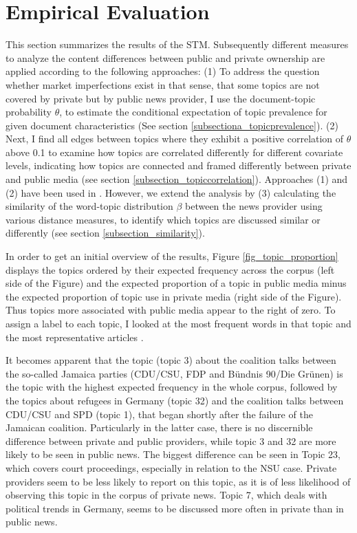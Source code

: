 \documentclass[12pt,a4paper,notitlepage]{article}
\begin{document}
\section{Empirical Evaluation}\label{ch_empirical}

This section summarizes the results of the STM. Subsequently different measures to analyze the content differences between public and private ownership are applied according to the following approaches: (1) To address the question whether market imperfections exist in that sense, that some topics are not covered by private but by public news provider, I use the document-topic probability $\theta$, to estimate the conditional expectation of topic prevalence for given document characteristics (See section \ref{subsectiona_topicprevalence}). (2) Next, I find all edges between topics where they exhibit a positive correlation of $\theta$ above 0.1 to examine how topics are correlated differently for different covariate levels, indicating how topics are connected and framed differently between private and public media (see section \ref{subsection_topiccorrelation}). Approaches (1) and (2) have been used in \citep{roberts_model_2016}. However, we extend the analysis by (3) calculating the similarity of the word-topic distribution $\beta$ between the news provider using various distance measures, to identify which topics are discussed similar or differently (see section \ref{subsection_similarity}). 

In order to get an initial overview of the results, Figure \ref{fig_topic_proportion} displays the topics ordered by their expected frequency across the corpus (left side of the Figure) and the expected proportion of a topic in public media minus the expected proportion of topic use in private media (right side of the Figure). Thus topics more associated with public media appear to the right of zero. To assign a label to each topic, I looked at the most frequent words in that topic and the most representative articles \citep{roberts_model_2016}. 

It becomes apparent that the topic (topic 3) about the coalition talks between the so-called Jamaica parties (CDU/CSU, FDP and Bündnis 90/Die Grünen) is the topic with the highest expected frequency in the whole corpus, followed by the topics about refugees in Germany (topic 32) and the coalition talks between CDU/CSU and SPD (topic 1), that began shortly after the failure of the Jamaican coalition. Particularly in the latter case, there is no discernible difference between private and public providers, while topic 3 and 32 are more likely to be seen in public news. The biggest difference can be seen in Topic 23, which covers court proceedings, especially in relation to the NSU case. Private providers seem to be less likely to report on this topic, as it is of less likelihood of observing this topic in the corpus of private news. Topic 7, which deals with political trends in Germany, seems to be discussed more often in private than in public news.    
\end{document}
